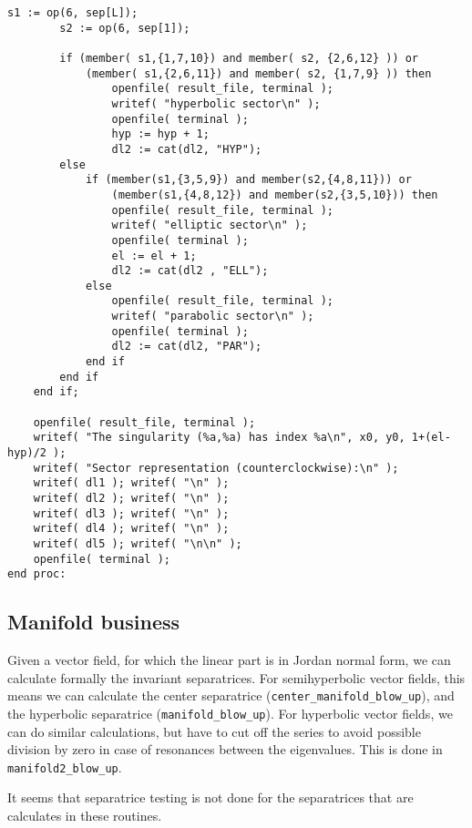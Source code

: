 \documentclass[a4paper,10pt]{article}
\begin{document}
\begin{lstlisting}[name=blowup]
        s1 := op(6, sep[L]);
        s2 := op(6, sep[1]);

        if (member( s1,{1,7,10}) and member( s2, {2,6,12} )) or
            (member( s1,{2,6,11}) and member( s2, {1,7,9} )) then
                openfile( result_file, terminal );
                writef( "hyperbolic sector\n" );
                openfile( terminal );
                hyp := hyp + 1;
                dl2 := cat(dl2, "HYP");
        else
            if (member(s1,{3,5,9}) and member(s2,{4,8,11})) or
                (member(s1,{4,8,12}) and member(s2,{3,5,10})) then
                openfile( result_file, terminal );
                writef( "elliptic sector\n" );
                openfile( terminal );
                el := el + 1;
                dl2 := cat(dl2 , "ELL");
            else
                openfile( result_file, terminal );
                writef( "parabolic sector\n" );
                openfile( terminal );
                dl2 := cat(dl2, "PAR");
            end if
        end if
    end if;

    openfile( result_file, terminal );
    writef( "The singularity (%a,%a) has index %a\n", x0, y0, 1+(el-hyp)/2 );
    writef( "Sector representation (counterclockwise):\n" );
    writef( dl1 ); writef( "\n" );
    writef( dl2 ); writef( "\n" );
    writef( dl3 ); writef( "\n" );
    writef( dl4 ); writef( "\n" );
    writef( dl5 ); writef( "\n\n" );
    openfile( terminal );
end proc:
\end{lstlisting}

\subsection{Manifold business}

Given a vector field, for which the linear part is in Jordan normal form, we can calculate formally the invariant
separatrices.  For semihyperbolic vector fields, this means we can calculate the center separatrice
(\verb+center_manifold_blow_up+), and the hyperbolic separatrice (\verb+manifold_blow_up+).  For hyperbolic
vector fields, we can do similar calculations, but have to cut off the series to avoid possible division by zero
in case of resonances between the eigenvalues. This is done in \verb+manifold2_blow_up+.
\smallskip

It seems that separatrice testing is not done for the separatrices that are calculates in these routines.
\end{document}
